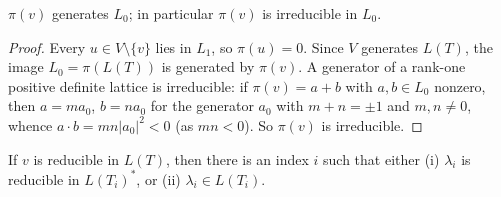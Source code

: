 \begin{lem}\label{lem:irred0}
$\pi(v)$ generates $L_0$; in particular $\pi(v)$ is irreducible in $L_0$.
\end{lem}

\begin{proof}
Every $u\in V\setminus\{v\}$ lies in $L_1$, so $\pi(u)=0$. Since $V$ generates
$L(T)$, the image $L_0=\pi(L(T))$ is generated by $\pi(v)$. A generator of a
rank-one positive definite lattice is irreducible: if $\pi(v)=a+b$ with
$a,b\in L_0$ nonzero, then $a=ma_0$, $b=na_0$ for the generator $a_0$ with
$m+n=\pm1$ and $m,n\neq0$, whence $a\cdot b=mn|a_0|^2<0$ (as $mn<0$). So $\pi(v)$
is irreducible.
\end{proof}

\begin{lem}\label{lem:dichotomy}
If $v$ is reducible in $L(T)$, then there is an index $i$ such that either
\textup{(i)} $\lambda_i$ is reducible in $L(T_i)^{*}$, or \textup{(ii)}
$\lambda_i\in L(T_i)$.
\end{lem}

